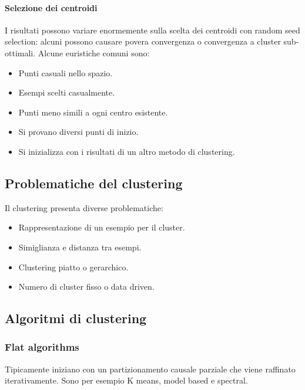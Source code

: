 		\paragraph{Selezione dei centroidi}
		I risultati possono variare enormemente sulla scelta dei centroidi con random seed selection: alcuni possono causare povera convergenza o convergenza a cluster sub-ottimali.
		Alcune euristiche comuni sono:
		\begin{multicols}{2}
			\begin{itemize}
				\item Punti casuali nello spazio.
				\item Esempi scelti casualmente.
				\item Punti meno simili a ogni centro esistente.
				\item Si provano diversi punti di inizio.
				\item Si inizializza con i risultati di un altro metodo di clustering.
			\end{itemize}
		\end{multicols}

	\subsection{Problematiche del clustering}
	Il clustering presenta diverse problematiche:
	\begin{multicols}{2}
		\begin{itemize}
			\item Rappresentazione di un esempio per il cluster.
			\item Simiglianza e distanza tra esempi.
			\item Clustering piatto o gerarchico.
			\item Numero di cluster fisso o data driven.
		\end{itemize}
	\end{multicols}
	
	\subsection{Algoritmi di clustering}

		\subsubsection{Flat algorithms}
		Tipicamente iniziano con un partizionamento causale parziale che viene raffinato iterativamente.
		Sono per esempio K means, model based e spectral.
		
